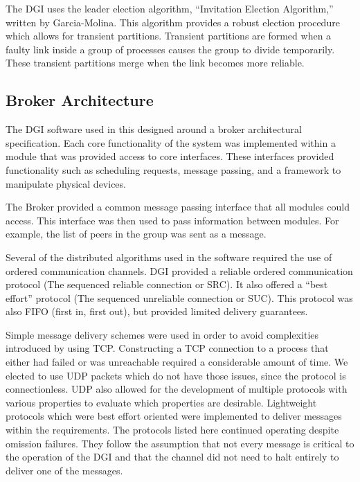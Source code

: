 The DGI uses the leader election algorithm, ``Invitation Election Algorithm,'' written by Garcia-Molina\cite{INVITATIONELECTION}.
This algorithm provides a robust election procedure which allows for transient partitions.
Transient partitions are formed when a faulty link inside a group of processes causes the group to divide temporarily.
These transient partitions merge when the link becomes more reliable.

\subsection{Broker Architecture}

The DGI software used in this designed around a broker architectural specification.
Each core functionality of the system was implemented within a module that was provided access to core interfaces.
These interfaces provided functionality such as scheduling requests, message passing, and a framework to manipulate physical devices.

The Broker provided a common message passing interface that all modules could access.
This interface was then used to pass information between modules. 
For example, the list of peers in the group was sent as a message. 

Several of the distributed algorithms used in the software required the use of ordered communication channels.
DGI provided a reliable ordered communication protocol (The sequenced reliable connection or SRC).
It also offered a ``best effort'' protocol (The sequenced unreliable connection or SUC).
This protocol was also FIFO (first in, first out), but provided limited delivery guarantees.

Simple message delivery schemes were used in order to avoid complexities introduced by using TCP.
Constructing a TCP connection to a process that either had failed or was unreachable required a considerable amount of time.
We elected to use UDP packets which do not have those issues, since the protocol is connectionless.
UDP also allowed for the development of multiple protocols with various properties to evaluate which properties are desirable.
Lightweight protocols which were best effort oriented were implemented to deliver messages within the requirements.
The protocols listed here continued operating despite omission failures.
They follow the assumption that not every message is critical to the operation of the DGI and that the channel did not need to halt entirely to deliver one of the messages.

